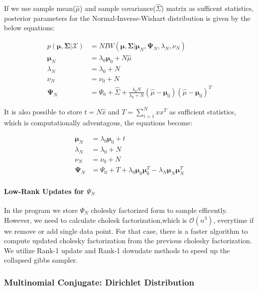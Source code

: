 \documentclass[a4paper]{article}
\begin{document}
If we use sample mean(\(\hat{\mu}\)) and sample
covariance(\(\hat{\Sigma}\)) matrix as sufficent statistics, posterior
parameters for the Normal-Inverse-Wishart distribution is given by the
below equations\cite{kamper2013gibbs}:

\begin{align*}
p(\boldsymbol\mu,\boldsymbol\Sigma|\mathcal{X}) & = NIW(\boldsymbol\mu,\boldsymbol\Sigma| \boldsymbol  \mu_N,  \boldsymbol  \Psi_N, \lambda_N, \nu_N)  \\
\boldsymbol \mu_N & = \lambda_0 \boldsymbol \mu_0 + N \hat{\mu} \\
\lambda_N & = \lambda_0 + N \\
\nu_N & = \nu_0 + N \\
\boldsymbol \Psi_N &=  \Psi_0 + \hat{\Sigma} + \frac{\lambda_0N}{\lambda_0+N}(\hat{\mu}-\boldsymbol \mu_0)(\hat{\mu}-\boldsymbol \mu_0)^T
\end{align*}

It is also possible to store \(t =N\hat{x}\) and \(T=\sum_{i=1}^Nxx^T\)
as sufficient statistics, which is computationally adventagous, the
equations become:

\begin{align*}
\boldsymbol \mu_N & = \lambda_0 \boldsymbol \mu_0 + t \\
\lambda_N & = \lambda_0 + N \\
\nu_N & = \nu_0 + N \\
\boldsymbol \Psi_N &=  \Psi_0 + T + \lambda_0\boldsymbol\mu_0\boldsymbol\mu_0^T-\lambda_N\boldsymbol\mu_N\boldsymbol\mu_N ^T
\end{align*}


\paragraph{\texorpdfstring{Low-Rank Updates for
\(\Psi_N\)}{Low-Rank Updates for \textbackslash Psi\_N}}

In the program we store \(\Psi_N\) cholesky factorized form to sample
efficently. However, we need to calculate cholesk factorization,which is
$\mathcal{O}(n^3)$, everytime if we remove or add single data point.
For that case, there is a faster algorithm to compute updated cholesky
factorization from the previous cholesky factorization\cite{Seeger:161468}. We utilize Rank-1
update and Rank-1 downdate methods to speed up the collapsed gibbs
sampler.


\subsubsection{Multinomial Conjugate: Dirichlet Distribution}
\end{document}
